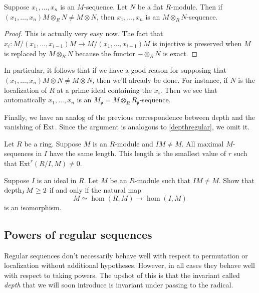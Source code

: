\begin{proposition} 
Suppose $x_1, \dots, x_n$ is an $M$-sequence. Let $N$ be a flat $R$-module.
Then if $(x_1, \dots, x_n)M \otimes_R N \neq M \otimes N$, then $x_1, \dots, x_n$
is an $M \otimes_R N$-sequence.
\end{proposition} 
\begin{proof} 
This is actually very easy now. The fact that $x_i: M/(x_1, \dots, x_{i-1})M
\to M/(x_1, \dots, x_{i-1})M$ is injective is preserved when $M$ is replaced by
$M \otimes_R N$ because the functor $- \otimes_R N$ is exact. 
\end{proof} 

In particular, it follows that if we have a good reason for supposing that
$(x_1,\dots, x_n) M \otimes N \neq M \otimes N$, then we'll already be
done. For instance, if $N$ is the localization of $R$ at a prime ideal
containing the $x_i$. Then we see that automatically $x_1, \dots, x_n$ is an
$M_{\mathfrak{p}} = M \otimes_R R_{\mathfrak{p}}$-sequence. 

Finally, we have an analog of the previous correspondence between depth and
the vanishing of $\operatorname{Ext}$. Since the argument is analogous to
\cref{depthregular}, we omit it.
\begin{theorem}
\label{depthextI}
Let $R$ be a ring. Suppose $M$ is an $R$-module and $IM \neq M$.
All maximal $M$-sequences in $I$ have the same length. This length is the
smallest value of $r$ such that $\mathrm{Ext}^r(R/I, M) \neq 0$.
\end{theorem} 

\begin{exercise} 
Suppose $I$ is an ideal in $R$. Let $M$ be an $R$-module such that $IM \neq
M$. Show that $\operatorname{depth}_I M \geq 2$ if and only if the natural map
\[ M \simeq \hom(R, M) \to \hom(I, M)  \]
is an isomorphism.
\end{exercise} 


\subsection{Powers of regular sequences}

Regular sequences don't necessarily behave well with respect to permutation or
localization without additional hypotheses. However, in all cases they behave
well with respect to taking powers. The upshot of this is that the invariant
called \textit{depth} that we will soon introduce is invariant under passing to
the radical.

